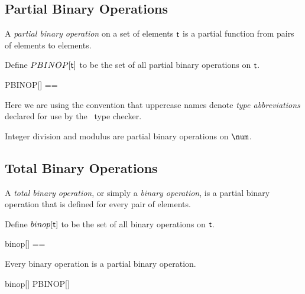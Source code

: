 \documentclass{amsart}
\begin{document}
\subsection{Partial Binary Operations}

A \textit{partial binary operation} on a set of elements $\mathsf{t}$ 
is a partial function from pairs of elements to elements.

Define $PBINOP[\mathsf{t}]$ to be the set of all partial binary operations on $\mathsf{t}$.

\begin{zed}
	PBINOP[\genT] == \genT \cross \genT \pfun \genT
\end{zed}


Here we are using the convention that uppercase names denote 
\textit{type abbreviations} declared for use by the \fuzz\ type checker.

\begin{example}

Integer division and modulus are partial binary operations on $\num$.


\end{example}

\subsection{Total Binary Operations}

A \textit{total binary operation}, or simply a \textit{binary operation}, 
is a partial binary operation that is defined for every pair of elements.

Define $binop[\mathsf{t}]$ to be the set of all binary operations on $\mathsf{t}$.

\begin{zed}
	binop[\genT] == \genT \cross \genT \fun \genT
\end{zed}

\begin{remark} Every binary operation is a partial binary operation.

\begin{zed}
	binop[\setT] \subseteq PBINOP[\setT]
\end{zed}

\end{remark}
\end{document}

